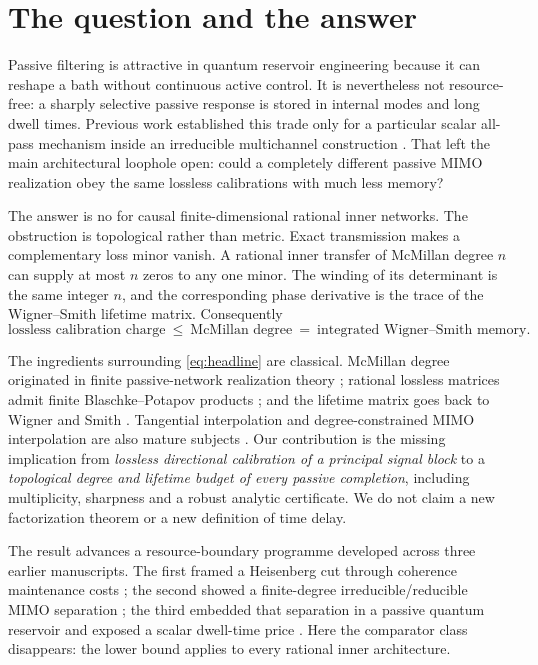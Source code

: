 \documentclass[11pt]{article}
\theoremstyle{definition}
\theoremstyle{remark}
\begin{document}
\section{The question and the answer}

Passive filtering is attractive in quantum reservoir engineering because it
can reshape a bath without continuous active control.  It is nevertheless
not resource-free: a sharply selective passive response is stored in internal
modes and long dwell times.  Previous work established this trade only for a
particular scalar all-pass mechanism inside an irreducible multichannel
construction \cite{ErikssonReservoir2026}.  That left the main architectural
loophole open: could a completely different passive MIMO realization obey the
same lossless calibrations with much less memory?

The answer is no for causal finite-dimensional rational inner networks.  The
obstruction is topological rather than metric.  Exact transmission makes a
complementary loss minor vanish.  A rational inner transfer of McMillan degree
$n$ can supply at most $n$ zeros to any one minor.  The winding of its
determinant is the same integer $n$, and the corresponding phase derivative
is the trace of the Wigner--Smith lifetime matrix.  Consequently
\begin{equation}\label{eq:headline}
 \boxed{
  \text{lossless calibration charge}
  \ \leq\ \text{McMillan degree}
  \ =\ \text{integrated Wigner--Smith memory}.}
\end{equation}

The ingredients surrounding \eqref{eq:headline} are classical.  McMillan
degree originated in finite passive-network realization theory
\cite{McMillan1952}; rational lossless matrices admit finite
Blaschke--Potapov products \cite{Potapov1955,AlpayJorgensenLewkowicz2016}; and
the lifetime matrix goes back to Wigner and Smith
\cite{Wigner1955,Smith1960}.  Tangential interpolation and degree-constrained
MIMO interpolation are also mature subjects
\cite{BallKang1990,GallivanEtAl2004,BallBolotnikov2017}.  Our contribution is
the missing implication from
\emph{lossless directional calibration of a principal signal block} to a
\emph{topological degree and lifetime budget of every passive completion},
including multiplicity, sharpness and a robust analytic certificate.  We do
not claim a new factorization theorem or a new definition of time delay.

The result advances a resource-boundary programme developed across three
earlier manuscripts.  The first framed a Heisenberg cut through coherence
maintenance costs \cite{ErikssonCut2026}; the second showed a finite-degree
irreducible/reducible MIMO separation \cite{ErikssonMIMO2026}; the third
embedded that separation in a passive quantum reservoir and exposed a scalar
dwell-time price \cite{ErikssonReservoir2026}.  Here the comparator class
disappears: the lower bound applies to every rational inner architecture.
\end{document}
